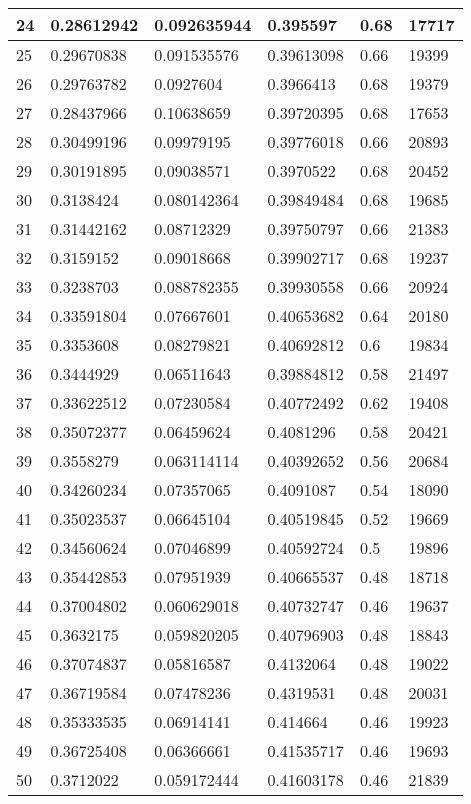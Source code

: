 \begin{longtable}{|l|l|l|l|l|l|}
24 & 0.28612942 & 0.092635944 & 0.395597 & 0.68 & 17717 \\ \hline 
25 & 0.29670838 & 0.091535576 & 0.39613098 & 0.66 & 19399 \\ \hline 
26 & 0.29763782 & 0.0927604 & 0.3966413 & 0.68 & 19379 \\ \hline 
27 & 0.28437966 & 0.10638659 & 0.39720395 & 0.68 & 17653 \\ \hline 
28 & 0.30499196 & 0.09979195 & 0.39776018 & 0.66 & 20893 \\ \hline 
29 & 0.30191895 & 0.09038571 & 0.3970522 & 0.68 & 20452 \\ \hline 
30 & 0.3138424 & 0.080142364 & 0.39849484 & 0.68 & 19685 \\ \hline 
31 & 0.31442162 & 0.08712329 & 0.39750797 & 0.66 & 21383 \\ \hline 
32 & 0.3159152 & 0.09018668 & 0.39902717 & 0.68 & 19237 \\ \hline 
33 & 0.3238703 & 0.088782355 & 0.39930558 & 0.66 & 20924 \\ \hline 
34 & 0.33591804 & 0.07667601 & 0.40653682 & 0.64 & 20180 \\ \hline 
35 & 0.3353608 & 0.08279821 & 0.40692812 & 0.6 & 19834 \\ \hline 
36 & 0.3444929 & 0.06511643 & 0.39884812 & 0.58 & 21497 \\ \hline 
37 & 0.33622512 & 0.07230584 & 0.40772492 & 0.62 & 19408 \\ \hline 
38 & 0.35072377 & 0.06459624 & 0.4081296 & 0.58 & 20421 \\ \hline 
39 & 0.3558279 & 0.063114114 & 0.40392652 & 0.56 & 20684 \\ \hline 
40 & 0.34260234 & 0.07357065 & 0.4091087 & 0.54 & 18090 \\ \hline 
41 & 0.35023537 & 0.06645104 & 0.40519845 & 0.52 & 19669 \\ \hline 
42 & 0.34560624 & 0.07046899 & 0.40592724 & 0.5 & 19896 \\ \hline 
43 & 0.35442853 & 0.07951939 & 0.40665537 & 0.48 & 18718 \\ \hline 
44 & 0.37004802 & 0.060629018 & 0.40732747 & 0.46 & 19637 \\ \hline 
45 & 0.3632175 & 0.059820205 & 0.40796903 & 0.48 & 18843 \\ \hline 
46 & 0.37074837 & 0.05816587 & 0.4132064 & 0.48 & 19022 \\ \hline 
47 & 0.36719584 & 0.07478236 & 0.4319531 & 0.48 & 20031 \\ \hline 
48 & 0.35333535 & 0.06914141 & 0.414664 & 0.46 & 19923 \\ \hline 
49 & 0.36725408 & 0.06366661 & 0.41535717 & 0.46 & 19693 \\ \hline 
50 & 0.3712022 & 0.059172444 & 0.41603178 & 0.46 & 21839 \\ \hline 
\end{longtable}